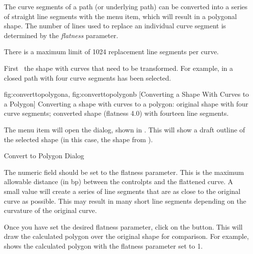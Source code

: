 
The \gls{curve} segments of a \gls{path} (or underlying path)
can be converted into a series of straight line segments with the
 menu item, which will result in
a polygonal shape. The number of lines used to replace an individual
curve segment is determined by the \emph{flatness} parameter.

\begin{information}
There is a maximum limit of 1024 replacement line segments per
\gls{curve}.
\end{information}

First \select\ the \gls{shape} with \glspl{curve} that need to be transformed.
For example, in  a closed \gls{path}
with four \gls{curve} segments has been selected.

{
  {fig:converttopolygona}{}{},
  {fig:converttopolygonb}{}{}
}
[Converting a Shape With Curves to a Polygon]
{Converting a shape with curves to a polygon:
 original shape with four
curve segments;
 converted shape (flatness 4.0) 
with fourteen line segments.}



The  menu item will open the
 dialog, shown in .
This will show a draft outline of the selected shape (in this case,
the shape from ).

{}
{Convert to Polygon Dialog}


The  numeric field should be set to the
flatness parameter. This is the maximum allowable distance (in \gls{bp})
between the \glspl{controlpt} and the flattened \gls{curve}. A small
value will create a series of line segments that are as close to the
original curve as possible. This may result in many short line
segments depending on the curvature of the original \gls{curve}.


Once you have set the desired flatness parameter, click on the
 button. This will draw the calculated
polygon over the original shape for comparison. For example, 
 shows the calculated polygon with
the flatness parameter set to 1.

